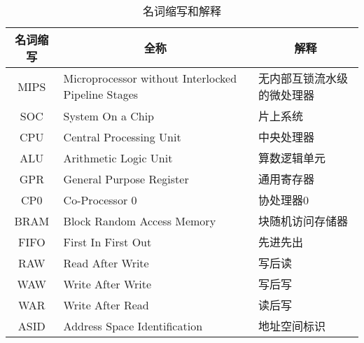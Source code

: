 \begin{table}[!htbp]
    \centering
    \caption{名词缩写和解释}
    \label{table:abbreviation_definition}
    
    \begin{tabular}{cll}
    \toprule
    \multicolumn{1}{c}{\textbf{名词缩写}} & \multicolumn{1}{c}{\textbf{全称}}                   & \multicolumn{1}{c}{\textbf{解释}} \\ 
    \midrule
    MIPS                               & Microprocessor without Interlocked Pipeline Stages & 无内部互锁流水级的微处理器 \\
    SOC                                & System On a Chip                                   & 片上系统 \\
    CPU                                & Central Processing Unit                            & 中央处理器 \\
    ALU                                & Arithmetic Logic Unit                              & 算数逻辑单元 \\
    GPR                                & General Purpose Register                           & 通用寄存器 \\
    CP0                                & Co-Processor 0                                     & 协处理器0 \\
    BRAM                               & Block Random Access Memory                         & 块随机访问存储器 \\
    FIFO                               & First In First Out                                 & 先进先出 \\
    RAW                                & Read After Write                                   & 写后读 \\
    WAW                                & Write After Write                                  & 写后写 \\
    WAR                                & Write After Read                                   & 读后写 \\
    ASID                               & Address Space Identification                       & 地址空间标识 \\
    \bottomrule
    \end{tabular}
\end{table}

